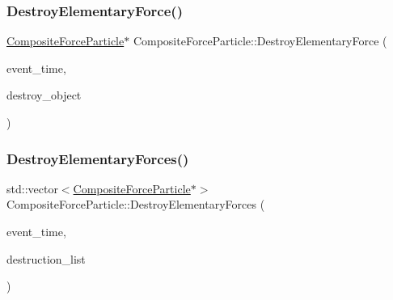 \mbox{\label{classCompositeForceParticle_af12bbef12781e7b72a4569609f751af6}} 
\subsubsection{\texorpdfstring{Destroy\+Elementary\+Force()}{DestroyElementaryForce()}}
{\footnotesize\ttfamily \mbox{\hyperlink{classCompositeForceParticle}{Composite\+Force\+Particle}}$\ast$ Composite\+Force\+Particle\+::\+Destroy\+Elementary\+Force (\begin{DoxyParamCaption}\item[{std\+::chrono\+::time\+\_\+point$<$ \mbox{\hyperlink{universe_8h_a0ef8d951d1ca5ab3cfaf7ab4c7a6fd80}{Clock}} $>$}]{event\+\_\+time,  }\item[{\mbox{\hyperlink{classCompositeForceParticle}{Composite\+Force\+Particle}} $\ast$}]{destroy\+\_\+object }\end{DoxyParamCaption})}

\mbox{\label{classCompositeForceParticle_af07d8607737f7881aac6314313d800e3}} 
\subsubsection{\texorpdfstring{Destroy\+Elementary\+Forces()}{DestroyElementaryForces()}}
{\footnotesize\ttfamily std\+::vector$<$\mbox{\hyperlink{classCompositeForceParticle}{Composite\+Force\+Particle}}$\ast$$>$ Composite\+Force\+Particle\+::\+Destroy\+Elementary\+Forces (\begin{DoxyParamCaption}\item[{std\+::chrono\+::time\+\_\+point$<$ \mbox{\hyperlink{universe_8h_a0ef8d951d1ca5ab3cfaf7ab4c7a6fd80}{Clock}} $>$}]{event\+\_\+time,  }\item[{std\+::vector$<$ \mbox{\hyperlink{classCompositeForceParticle}{Composite\+Force\+Particle}} $\ast$$>$}]{destruction\+\_\+list }\end{DoxyParamCaption})}

